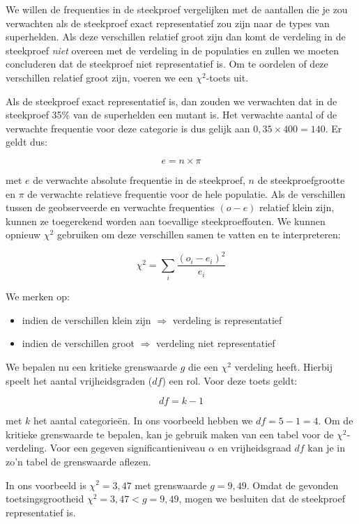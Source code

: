 We willen de frequenties in de steekproef vergelijken met de aantallen die je zou verwachten als de steekproef exact representatief zou zijn naar de types van superhelden. Als deze verschillen relatief groot zijn dan komt de verdeling in de steekproef \emph{niet} overeen met de verdeling in de populaties en zullen we moeten concluderen dat de steekproef niet representatief is. Om te oordelen of deze verschillen relatief groot zijn, voeren we een $\chi^{2}$-toets uit.

Als de steekproef exact representatief is, dan zouden we verwachten dat in de steekproef 35\% van de superhelden een mutant is. Het verwachte aantal of de verwachte frequentie voor deze categorie is dus gelijk aan $0,35 \times 400 = 140$. Er geldt dus:

\[ e = n \times \pi \]

met $e$ de verwachte absolute frequentie in de steekproef, $n$ de steekproefgrootte en $\pi$ de verwachte relatieve frequentie voor de hele populatie. Als de verschillen tussen de geobserveerde en verwachte frequenties $(o - e)$ relatief klein zijn, kunnen ze toegerekend worden aan toevallige steekproeffouten. We kunnen opnieuw $\chi^2$ gebruiken om deze verschillen samen te vatten en te interpreteren:

\[ \chi^{2} = \sum_i \frac{(o_{i} - e_{i})^{2}}{e_{i}} \]

We merken op:

\begin{itemize}
  \item indien de verschillen klein zijn $\Rightarrow$ verdeling is representatief
  \item indien de verschillen groot $\Rightarrow$ verdeling niet representatief
\end{itemize}

We bepalen nu een kritieke grenswaarde $g$ die een $\chi^{2}$ verdeling heeft. Hierbij speelt het aantal vrijheidsgraden ($df$) een rol. Voor deze toets geldt:

\[ df = k - 1 \]

met $k$ het aantal categorie\"en. In ons voorbeeld hebben we $df = 5-1 = 4$. Om de kritieke grenswaarde te bepalen, kan je gebruik maken van een tabel voor de $\chi^2$-verdeling. Voor een gegeven significantieniveau $\alpha$ en vrijheidsgraad $df$ kan je in zo'n tabel de grenswaarde aflezen.

In ons voorbeeld is $\chi^{2} = 3,47$ met grenswaarde $g = 9,49$. Omdat de gevonden toetsingsgrootheid $\chi^2 = 3,47 < g = 9,49$, mogen we besluiten dat de steekproef representatief is.

